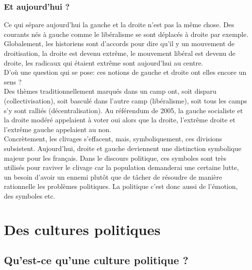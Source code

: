 \documentclass[12pt, a4paper, openany]{book}
\begin{document}
\subsection{Et aujourd'hui ?}

Ce qui sépare aujourd'hui la gauche et la droite n'est pas la même chose. Des courants nés à gauche comme le libéralisme se sont déplacés à droite par exemple. \\
Globalement, les historiens sont d'accords pour dire qu'il y un mouvement de droitisation, la droite est devenu extrême, le mouvement libéral est devenu de droite, les radicaux qui étaient extrême sont aujourd'hui au centre. \\
D'où une question qui se pose: ces notions de gauche et droite ont elles encore un sens ? \\
Des thèmes traditionnellement marqués dans un camp ont, soit disparu (collectivisation), soit basculé dans l'autre camp (libéralisme), soit tous les camps s'y sont ralliés (décentralisation). Au référendum de 2005, la gauche socialiste et la droite modéré appelaient à voter oui alors que la droite, l'extrême droite et l'extrême gauche appelaient au non. \\
Concrètement, les clivages s'effacent, mais, symboliquement, ces divisions subsistent. Aujourd'hui, droite et gauche deviennent une distinction symbolique majeur pour les français. Dans le discours politique, ces symboles sont très utilisés pour raviver le clivage car la population demanderai une certaine lutte, un besoin d'avoir un ennemi plutôt que de tâcher de résoudre de manière rationnelle les problèmes politiques. La politique c'est donc aussi de l'émotion, des symboles etc.


\chapter{Des cultures politiques}

\section{Qu'est-ce qu'une culture politique ?}
\end{document}
